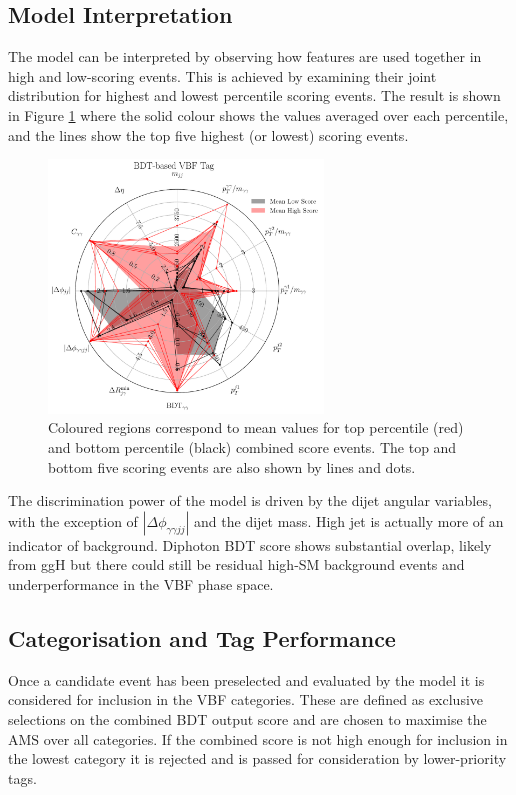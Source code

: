 \subsection{Model Interpretation}
The model can be interpreted by observing how features are used together in high and low-scoring events. This is achieved by examining their joint distribution for highest and lowest percentile scoring events. 
The result is shown in Figure \ref{fig:event_categorisaton:bdt_based_vbf_tag_interpretation} where the solid colour shows the values averaged over each percentile, and the lines show the top five highest (or lowest) scoring events.
\begin{figure}[h!]
    \centering
    \includegraphics[width=0.65\textwidth]{figures/event_selection/eng_feature_radar_BDT.pdf}
    \caption{Coloured regions correspond to mean values for top percentile (red) and bottom percentile (black) combined score events. 
             The top and bottom five scoring events are also shown by lines and dots.}
    \label{fig:event_categorisaton:bdt_based_vbf_tag_interpretation}
\end{figure}

The discrimination power of the model is driven by the dijet angular variables, with the exception of $|\Delta\phi_{\gamma\gamma{jj}}|$ and the dijet mass.
High jet \pt is actually more of an indicator of background.
Diphoton BDT score shows substantial overlap, likely from ggH but there could still be residual high-\pt SM background events and underperformance in the VBF phase space.


\subsection{Categorisation and Tag Performance}
Once a candidate event has been preselected and evaluated by the model it is considered for inclusion in the VBF categories. 
These are defined as exclusive selections on the combined BDT output score and are chosen to maximise the $\mathrm{AMS}$ over all categories. 
If the combined score is not high enough for inclusion in the lowest category it is rejected and is passed for consideration by lower-priority tags. 

